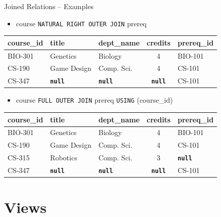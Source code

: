 \documentclass{beamer}
\begin{document}
\begin{frame}{Joined Relations – Examples}
    \normalsize
    \begin{itemize}
        \item course \texttt{NATURAL RIGHT OUTER JOIN} prereq
    \end{itemize}
    \scriptsize
    \begin{tabular}{| l | l | l | c | l |}
        \hline
        \textbf{course\_id} & \textbf{title} & \textbf{dept\_name} & \textbf{credits} & \textbf{prereq\_id} \\
        \hline
        BIO-301 & Genetics    & Biology    & 4 & BIO-101 \\
        \hline
        CS-190  & Game Design & Comp. Sci. & 4 & CS-101  \\
        \hline
        CS-347  & \texttt{\textbf{null}} & \texttt{\textbf{null}} & \texttt{\textbf{null}} & CS-101  \\
        \hline
    \end{tabular}
    \vspace{5mm}
    \normalsize
    \begin{itemize}
        \item course \texttt{FULL OUTER JOIN} prereq \texttt{USING} (course\_id)
    \end{itemize}
    \scriptsize
    \begin{tabular}{| l | l | l | c | l |}
        \hline
        \textbf{course\_id} & \textbf{title} & \textbf{dept\_name} & \textbf{credits} & \textbf{prereq\_id} \\
        \hline
        BIO-301 & Genetics    & Biology    & 4 & BIO-101 \\
        \hline
        CS-190  & Game Design & Comp. Sci. & 4 & CS-101  \\
        \hline
        CS-315  & Robotics    & Comp. Sci. & 3 & \textbf{\texttt{null}} \\
        \hline
        CS-347  & \texttt{\textbf{null}} & \texttt{\textbf{null}} & \texttt{\textbf{null}} & CS-101  \\
        \hline
    \end{tabular}
\end{frame}

\section{Views}
\end{document}

